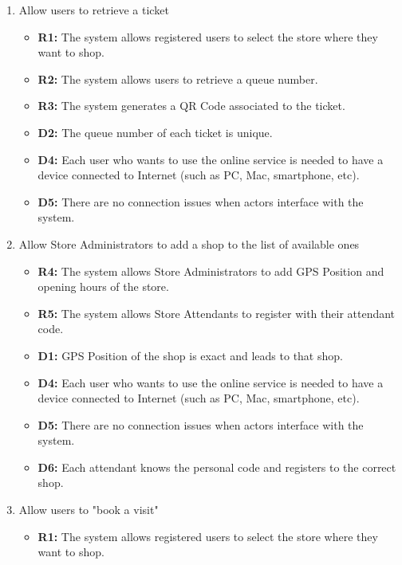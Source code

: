 \documentclass[table, 12pt]{article}
\begin{document}
\begin{enumerate}[label=\textbf{-G\arabic*}:]
    \item {Allow users to retrieve a ticket
          \begin{itemize}
              \item \textbf{R1:} The system allows registered users to select the store where they want to shop.
              \item \textbf{R2:} The system allows users to retrieve a queue number.
              \item \textbf{R3:} The system generates a QR Code associated to the ticket.
              \item \textbf{D2:} The queue number of each ticket is unique.
              \item \textbf{D4:} Each user who wants to use the online service is needed to have a device connected to Internet (such as PC, Mac, smartphone, etc).
              \item \textbf{D5:} There are no connection issues when actors interface with the system.
          \end{itemize}
          }
    \item {Allow Store Administrators to add a shop to the list of available ones
          \begin{itemize}
              \item\textbf{R4:} The system allows Store Administrators to add GPS Position and opening hours of the store.
              \item \textbf{R5:} The system allows Store Attendants to register with their attendant code.
              \item \textbf{D1:} GPS Position of the shop is exact and leads to that shop.
              \item \textbf{D4:} Each user who wants to use the online service is needed to have a device connected to Internet (such as PC, Mac, smartphone, etc).
              \item \textbf{D5:} There are no connection issues when actors interface with the system.
              \item \textbf{D6:} Each attendant knows the personal code and registers to the correct shop.
          \end{itemize}
          }
    \item {Allow users to "book a visit"
          \begin{itemize}
              \item \textbf{R1:} The system allows registered users to select the store where they want to shop.

\end{itemize}}
\end{enumerate}
\end{document}
